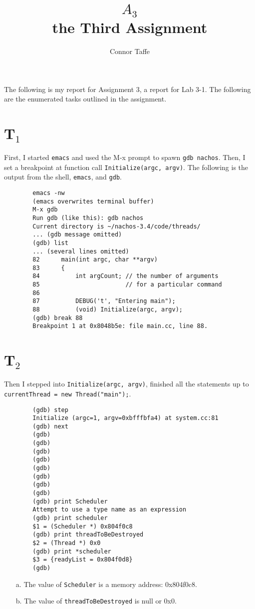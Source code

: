\documentclass[letterpaper, 10pt]{article}
\title{
	$A_3$\\
	{\large the Third Assignment}
}
\author{Connor Taffe}
\begin{document}
	\maketitle

	The following is my report for Assignment 3, a report for Lab 3-1. The following are the enumerated tasks outlined in the assignment.

	\section*{T$_1$}

	First, I started {\tt emacs} and used the M-x prompt to spawn {\tt gdb nachos}. Then, I set a breakpoint at function call {\tt Initialize(argc, argv)}. The following is the output from the shell, {\tt emacs}, and {\tt gdb}.

	\begin{verbatim}
		emacs -nw
		(emacs overwrites terminal buffer)
		M-x gdb
		Run gdb (like this): gdb nachos
		Current directory is ~/nachos-3.4/code/threads/
		... (gdb message omitted)
		(gdb) list
		... (several lines omitted)
		82      main(int argc, char **argv)
		83      {
		84          int argCount; // the number of arguments
		85                        // for a particular command
		86
		87          DEBUG('t', "Entering main");
		88          (void) Initialize(argc, argv);
		(gdb) break 88
		Breakpoint 1 at 0x8048b5e: file main.cc, line 88.
	\end{verbatim}

	\section*{T$_2$}

	Then I stepped into {\tt Initialize(argc, argv)}, finished all the statements up to {\tt currentThread =
new Thread("main");}.

	\begin{verbatim}
		(gdb) step
		Initialize (argc=1, argv=0xbfffbfa4) at system.cc:81
		(gdb) next
		(gdb)
		(gdb)
		(gdb)
		(gdb)
		(gdb)
		(gdb)
		(gdb)
		(gdb)
		(gdb) print Scheduler
		Attempt to use a type name as an expression
		(gdb) print scheduler
		$1 = (Scheduler *) 0x804f0c8
		(gdb) print threadToBeDestroyed
		$2 = (Thread *) 0x0
		(gdb) print *scheduler
		$3 = {readyList = 0x804f0d8}
		(gdb)
	\end{verbatim}

	\begin{itemize}

	\item[a.]{The value of {\tt Scheduler} is a memory address: 0x804f0c8.}
	\item[b.]{The value of {\tt threadToBeDestroyed} is null or 0x0.}

	\end{itemize}
\end{document}
